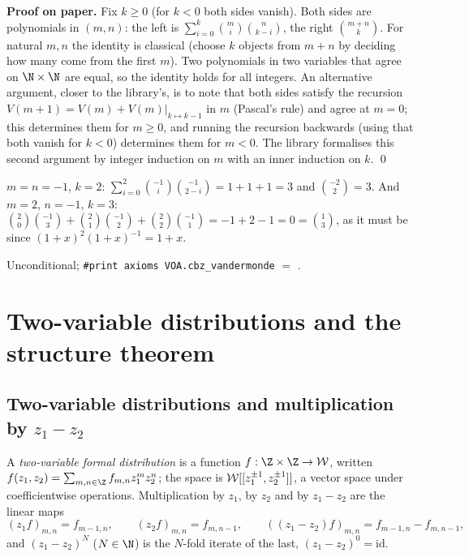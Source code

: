 \textbf{Proof on paper.} Fix $k\ge0$ (for $k<0$ both sides vanish). Both sides are polynomials in
$(m,n)$: the left is $\sum_{i=0}^{k}\binom mi\binom n{k-i}$, the right $\binom{m+n}k$. For natural
$m,n$ the identity is classical (choose $k$ objects from $m+n$ by deciding how many come from the first
$m$). Two polynomials in two variables that agree on $\N\times\N$ are equal, so the identity holds for all
integers. An alternative argument, closer to the library's, is to note that both sides satisfy the
recursion $V(m+1) = V(m)+V(m)|_{k\mapsto k-1}$ in $m$ (Pascal's rule) and agree at $m = 0$; this determines
them for $m\ge0$, and running the recursion backwards (using that both vanish for $k<0$) determines them
for $m<0$. The library formalises this second argument by integer induction on $m$ with an inner
induction on $k$. \qed

\begin{example}
$m = n = -1$, $k = 2$: $\sum_{i=0}^2\binom{-1}{i}\binom{-1}{2-i} = 1+1+1 = 3$ and $\binom{-2}{2} = 3$. And
$m = 2$, $n = -1$, $k = 3$: $\binom20\binom{-1}3+\binom21\binom{-1}2+\binom22\binom{-1}1 = -1+2-1 = 0 =
\binom13$, as it must be since $(1+x)^2(1+x)^{-1} = 1+x$.
\end{example}

\begin{status}
Unconditional; \texttt{\#print axioms VOA.cbz\_vandermonde} $=$ .
\end{status}

\section{Two-variable distributions and the structure theorem}\label{l01:sec:twovar}

\subsection{Two-variable distributions and multiplication by \texorpdfstring{$z_1-z_2$}{z1-z2}}

\begin{definition}\label{l01:def:formaldist2}
A \emph{two-variable formal distribution} is a function $f:\Z\times\Z\to\loneW$, written
$f(z_1,z_2) = \sum_{m,n\in\Z}f_{m,n}z_1^mz_2^n$; the space is $\mathcal{W}[[z_1^{\pm1},z_2^{\pm1}]]$, a vector space
under coefficientwise operations. Multiplication by $z_1$, by $z_2$ and by $z_1-z_2$ are the linear maps
\begin{equation*}
  (z_1f)_{m,n} = f_{m-1,n},\qquad (z_2f)_{m,n} = f_{m,n-1},\qquad
  ((z_1-z_2)f)_{m,n} = f_{m-1,n}-f_{m,n-1},
\end{equation*}
and $(z_1-z_2)^N$ ($N\in\N$) is the $N$-fold iterate of the last, $(z_1-z_2)^0 = \mathrm{id}$.
\end{definition}

